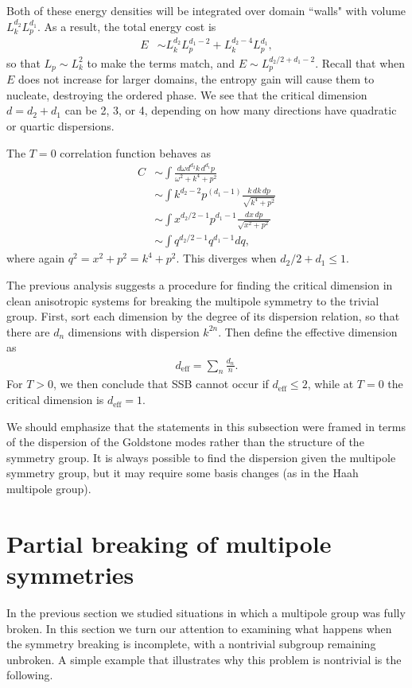 \documentclass[prb,aps,twocolumn, amsfonts,amsmath,amssymb,nofootinbib,superscriptaddress]{revtex4-2}
\newcommand{\nn}{\nonumber\\}
\newcommand{\eff}{\text{eff}}
\begin{document}
Both of these energy densities will be integrated over domain ``walls" with volume $L_k^{d_2} L_p^{d_1}$.
As a result, the total energy cost is
\begin{align}
E &\sim L_k^{d_2} L_p^{d_1-2} + L_k^{d_2-4} L_p^{d_1},
\end{align}
so that $L_p \sim L_k^2$ to make the terms match, and $E\sim L_p^{d_2/2+d_1-2}$. Recall that when $E$ does not increase for larger domains, the entropy gain will cause them to nucleate, destroying the ordered phase.
We see that the critical dimension $d= d_2 + d_1$ can be 2, 3, or 4, depending on how many directions have quadratic or quartic dispersions.

The $T=0$ correlation function behaves as
\begin{align}
C &\sim \int \frac{d\omega d^{d_2} k \, d^{d_1} p}{\omega^2 + k^4 + p^2}\nn
&\sim \int k^{d_2 - 2} p^{ (d_1-1)} \frac{k\,dk\, dp}{\sqrt{k^4 + p^2}} \nn
&\sim \int x^{d_2/2-1} p^{d_1-1} \frac{dx\, dp}{\sqrt{x^2 + p^2}} \nn
&\sim \int q^{d_2/2 -1} q^{d_1 -1} dq,
\end{align}
where again $q^2 = x^2 + p^2 = k^4 + p^2$. This diverges when $d_2/2 + d_1 \le 1$. 

The previous analysis suggests a procedure for finding the critical dimension in clean anisotropic systems for breaking the multipole symmetry to the trivial group. First, sort each dimension by the degree of its dispersion relation, so that there are $d_n$ dimensions with dispersion $k^{2n}$. Then define the effective dimension as 
\begin{align}
d_\eff = \sum_n \frac{d_n}{n}.
\end{align}
For $T>0$, we then conclude that SSB cannot occur if $d_\eff\le 2$, while at $T=0$ the critical dimension is $d_\eff = 1$.

We should emphasize that the statements in this subsection were framed in terms of the dispersion of the Goldstone modes rather than the structure of the symmetry group. It is always possible to find the dispersion given the multipole symmetry group, but it may require some basis changes (as in the Haah multipole group).

\section{Partial breaking of multipole symmetries} \label{sec:partial}

In the previous section we studied situations in which a multipole group was fully broken. In this section we turn our attention to examining what happens when the symmetry breaking is incomplete, with a nontrivial subgroup remaining unbroken. A simple example that illustrates why this problem is nontrivial is the following. 
 
\end{document}
